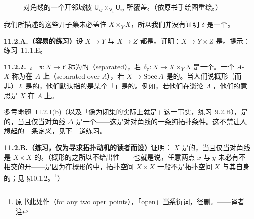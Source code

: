 \begin{figure}[htbp]
\centering
{}
\caption{对角线的一个开邻域被 $\mathsf{U}_{ij}\times_{\mathsf{V}_i}\mathsf{U}_{ij}$ 所覆盖。（依原书手绘图重绘。）}\label{fig:diagonal-neighborhood}
\end{figure}

我们所描述的这些开子集未必盖住 $X\times_Y X$，所以我们并没有证明 $\delta$ 是一个\trClosedEmbedding。

\textbf{11.2.A.（容易的练习）}\quad 设 $X\to Y$ 与 $X\to Z$ 都是\trLocallyClosedEmbedding。证明：$X\to Y\times Z$ 是\trLocallyClosedEmbedding。提示：\mbox{练习~11.1.E}。

\textbf{11.2.2.}\ \emph{\trhDefinition{}。}\quad \trMorphism{} $\pi\colon X\to Y$ 称为\textbf{\trSeparated}的（separated），若\trDiagonalMorphism{} $\delta_\pi\colon X\to X\times_Y X$ 是一个\trClosedEmbedding。一个 $A$-\trScheme{} $X$ 称为\textbf{在 $A$ 上\trSeparated}（separated over $A$），若\trStructureMorphism{} $X\to\operatorname{Spec} A$ 是\trSeparated{}的。当人们说概形（而非\trMorphism{}）$X$ 是\trSeparated{}的，他们默认指的是某个「\trStructureMorphism」是\trSeparated{}的。例如，若他们在谈论 $A$-\trScheme，他们的意思是 $X$ 在 $A$ 上\trSeparated。

多亏命题~11.2.1(b)（以及「像为闭集的\trLocallyClosedEmbedding{}实际上就是\trClosedEmbedding」这一事实，\mbox{练习~9.2.B}），\trMorphism{}是\trSeparated{}的，当且仅当对角线 $\Delta$ 是一个\trClosedSubset——这是对对角线的一条纯拓扑条件。这不禁让人想起\trHausdorff{}的一条定义，见下一道练习。

\textbf{11.2.B.（练习，仅为寻求拓扑动机的读者而设）}\quad 证明：\trTopologicalSpace{} $X$ 是\trHausdorff{}的，当且仅当对角线是 $X\times X$ 的\trClosedSubset。（概形的\trSeparatedness{}之所以不给出\trHausdorff{}性——也就是说，任意两点 $x$ 与 $y$ 未必有不相交的开\trNeighborhood——是因为在概形的\trCategory{}中，拓扑空间 $X\times X$ 一般不是拓扑空间 $X$ 与其自身的\trProduct；见 \S10.1.2。\footnote{原书此处作（for any two open points），「open」当系衍词，径删。——译者注}）

